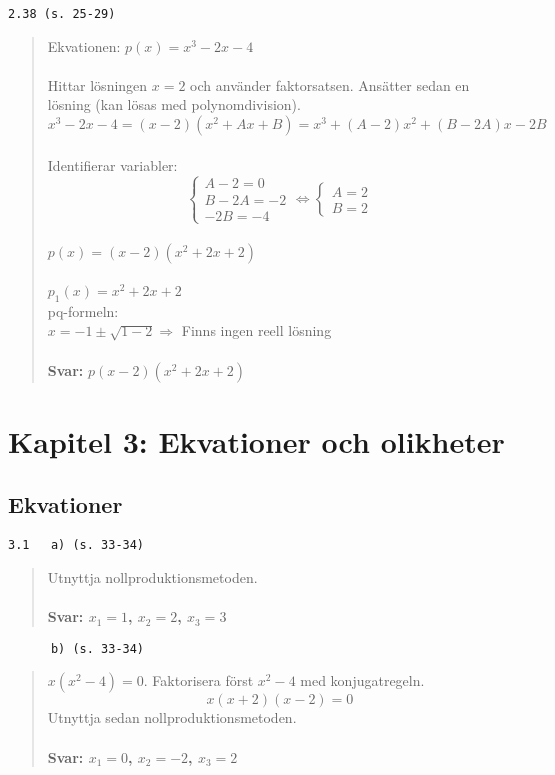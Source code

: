\documentclass[a4paper]{article}
\newcommand{\tskcol}[1]{\textcolor{tskcol}{#1}}
\begin{document}
	\texttt{\tskcol{2.38 (s. 25-29)}}
	\begin{quotation}
		\noindent
		Ekvationen: $p(x)=x^3-2x-4$ \\ \\
		Hittar lösningen $x=2$ och använder faktorsatsen. Ansätter sedan en lösning (kan lösas med polynomdivision). \\
		$x^3-2x-4=(x-2)(x^2+Ax+B)=x^3+(A-2)x^2+(B-2A)x-2B$ \\ \\
		Identifierar variabler: \\
		\[\begin{cases} 
			A-2=0 \\ 
			B-2A=-2 \\ 
			-2B=-4 
		\end{cases}
		\Leftrightarrow
		\begin{cases} 
			A=2 \\ 
			B=2
		\end{cases}\]
		\\
		$p(x)=(x-2)(x^2+2x+2)$ \\ \\
		$p_1(x)=x^2+2x+2$ \\
		pq-formeln: \\
		$x=-1\pm\sqrt{1-2} \Rightarrow$ Finns ingen reell lösning
		\\ \\
		\textbf{Svar:} $p(x-2)(x^2+2x+2)$
	\end{quotation}
	
	\pagebreak
	\section*{Kapitel 3: Ekvationer och olikheter}
	\subsection*{Ekvationer}
	
	\texttt{\tskcol{3.1~~~a) (s. 33-34)}}
	\begin{quotation}
		\noindent
		Utnyttja nollproduktionsmetoden.
		\\ \\
		\textbf{Svar: $x_1=1$, $x_2=2$, $x_3=3$}
	\end{quotation}
	
	\texttt{\tskcol{~~~~~~b) (s. 33-34)}}
	\begin{quotation}
		\noindent
		$x(x^2-4)=0$. Faktorisera först $x^2-4$ med konjugatregeln.
		\[x(x+2)(x-2)=0\]
		Utnyttja sedan nollproduktionsmetoden.
		\\ \\
		\textbf{Svar: $x_1=0$, $x_2=-2$, $x_3=2$}
	\end{quotation}
	
\end{document}
